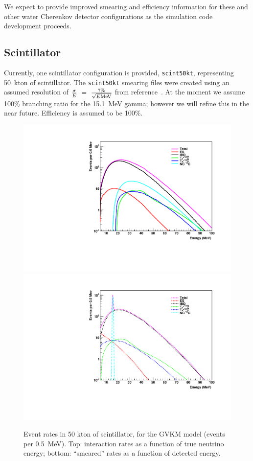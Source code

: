 \documentclass[12pt]{article}
\begin{document}
We expect to provide improved smearing and efficiency information for
these and other water Cherenkov detector configurations as the
simulation code development proceeds.

\subsection{Scintillator}

Currently, one scintillator configuration is provided,
\texttt{scint50kt}, representing 50~kton of scintillator.  The
\texttt{scint50kt} smearing files were created using an assumed
resolution of $\frac{\sigma}{E}~=~\frac{7\%}{\sqrt{E {\rm MeV}}}$
from reference~\cite{Eguchi:2002dm}.  At the moment we assume 100\% branching ratio for the 15.1~MeV gamma; however we will refine this in the near future.
Efficiency is assumed to be 100\%.


\begin{figure}[htb]
  \centering\includegraphics[width=.75\textwidth]{interaction_rates_gvkm_scint50kt.pdf}
  \centering\includegraphics[width=.75\textwidth]{smeared_rates_gvkm_scint50kt.pdf}

  \caption{Event rates in 50 kton of scintillator, for the GVKM model 
  (events per 0.5~MeV). Top: interaction rates as a
    function of true neutrino energy; bottom:  ``smeared''
    rates as a function of detected energy.}
  \label{fig:scintrates}
\end{figure}
\end{document}
